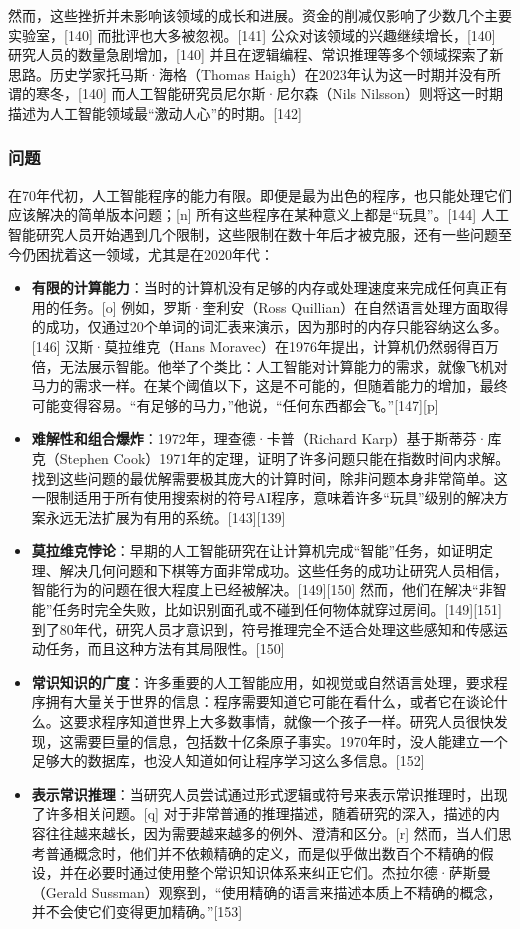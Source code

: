 然而，这些挫折并未影响该领域的成长和进展。资金的削减仅影响了少数几个主要实验室，[140] 而批评也大多被忽视。[141] 公众对该领域的兴趣继续增长，[140] 研究人员的数量急剧增加，[140] 并且在逻辑编程、常识推理等多个领域探索了新思路。历史学家托马斯·海格（Thomas Haigh）在2023年认为这一时期并没有所谓的寒冬，[140] 而人工智能研究员尼尔斯·尼尔森（Nils Nilsson）则将这一时期描述为人工智能领域最“激动人心”的时期。[142]
\subsubsection{问题}
在70年代初，人工智能程序的能力有限。即便是最为出色的程序，也只能处理它们应该解决的简单版本问题；[n] 所有这些程序在某种意义上都是“玩具”。[144] 人工智能研究人员开始遇到几个限制，这些限制在数十年后才被克服，还有一些问题至今仍困扰着这一领域，尤其是在2020年代：
\begin{itemize}
\item \textbf{有限的计算能力}：当时的计算机没有足够的内存或处理速度来完成任何真正有用的任务。[o] 例如，罗斯·奎利安（Ross Quillian）在自然语言处理方面取得的成功，仅通过20个单词的词汇表来演示，因为那时的内存只能容纳这么多。[146] 汉斯·莫拉维克（Hans Moravec）在1976年提出，计算机仍然弱得百万倍，无法展示智能。他举了个类比：人工智能对计算能力的需求，就像飞机对马力的需求一样。在某个阈值以下，这是不可能的，但随着能力的增加，最终可能变得容易。“有足够的马力，”他说，“任何东西都会飞。”[147][p]
\item \textbf{难解性和组合爆炸}：1972年，理查德·卡普（Richard Karp）基于斯蒂芬·库克（Stephen Cook）1971年的定理，证明了许多问题只能在指数时间内求解。找到这些问题的最优解需要极其庞大的计算时间，除非问题本身非常简单。这一限制适用于所有使用搜索树的符号AI程序，意味着许多“玩具”级别的解决方案永远无法扩展为有用的系统。[143][139]
\item \textbf{莫拉维克悖论}：早期的人工智能研究在让计算机完成“智能”任务，如证明定理、解决几何问题和下棋等方面非常成功。这些任务的成功让研究人员相信，智能行为的问题在很大程度上已经被解决。[149][150] 然而，他们在解决“非智能”任务时完全失败，比如识别面孔或不碰到任何物体就穿过房间。[149][151] 到了80年代，研究人员才意识到，符号推理完全不适合处理这些感知和传感运动任务，而且这种方法有其局限性。[150]
\item \textbf{常识知识的广度}：许多重要的人工智能应用，如视觉或自然语言处理，要求程序拥有大量关于世界的信息：程序需要知道它可能在看什么，或者它在谈论什么。这要求程序知道世界上大多数事情，就像一个孩子一样。研究人员很快发现，这需要巨量的信息，包括数十亿条原子事实。1970年时，没人能建立一个足够大的数据库，也没人知道如何让程序学习这么多信息。[152]
\item \textbf{表示常识推理}：当研究人员尝试通过形式逻辑或符号来表示常识推理时，出现了许多相关问题。[q] 对于非常普通的推理描述，随着研究的深入，描述的内容往往越来越长，因为需要越来越多的例外、澄清和区分。[r] 然而，当人们思考普通概念时，他们并不依赖精确的定义，而是似乎做出数百个不精确的假设，并在必要时通过使用整个常识知识体系来纠正它们。杰拉尔德·萨斯曼（Gerald Sussman）观察到，“使用精确的语言来描述本质上不精确的概念，并不会使它们变得更加精确。”[153]
\end{itemize}
